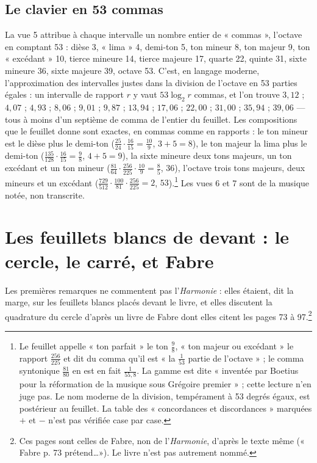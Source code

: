 \documentclass[11pt,a4paper]{article}
\begin{document}
\subsection*{Le clavier en 53 commas}

La vue 5 attribue à chaque intervalle un nombre entier de « commas », l'octave
en comptant 53 : dièse 3, « lima » 4, demi-ton 5, ton mineur 8, ton majeur 9,
ton « excédant » 10, tierce mineure 14, tierce majeure 17, quarte 22, quinte
31, sixte mineure 36, sixte majeure 39, octave 53. C'est, en langage moderne,
l'approximation des intervalles justes dans la division de l'octave en 53
parties égales : un intervalle de rapport $r$ y vaut $53\log_2 r$ commas, et
l'on trouve $3{,}12$ ; $4{,}07$ ; $4{,}93$ ; $8{,}06$ ; $9{,}01$ ; $9{,}87$ ;
$13{,}94$ ; $17{,}06$ ; $22{,}00$ ; $31{,}00$ ; $35{,}94$ ; $39{,}06$ — tous à
moins d'un septième de comma de l'entier du feuillet. Les compositions que le
feuillet donne sont exactes, en commas comme en rapports : le ton mineur est le
dièse plus le demi-ton ($\frac{25}{24}\cdot\frac{16}{15} = \frac{10}{9}$,
$3 + 5 = 8$), le ton majeur la lima plus le demi-ton ($\frac{135}{128}\cdot
\frac{16}{15} = \frac98$, $4 + 5 = 9$), la sixte mineure deux tons majeurs, un
ton excédant et un ton mineur ($\frac{81}{64}\cdot\frac{256}{225}\cdot
\frac{10}{9} = \frac85$, $36$), l'octave trois tons majeurs, deux mineurs et un
excédant ($\frac{729}{512}\cdot\frac{100}{81}\cdot\frac{256}{225} = 2$,
$53$).\footnote{Le feuillet appelle « ton parfait » le ton $\frac98$, « ton
majeur ou excédant » le rapport $\frac{256}{225}$ et dit du comma qu'il est
« la $\frac{1}{53}$ partie de l'octave » ; le comma syntonique $\frac{81}{80}$
en est en fait $\frac{1}{55{,}8}$. La gamme est dite « inventée par Boetius
pour la réformation de la musique sous Grégoire premier » ; cette lecture
n'en juge pas. Le nom moderne de la division, tempérament à 53 degrés égaux,
est postérieur au feuillet. La table des « concordances et discordances »
marquées $+$ et $-$ n'est pas vérifiée case par case.} Les vues 6 et 7 sont de
la musique notée, non transcrite.

\section*{Les feuillets blancs de devant : le cercle, le carré, et Fabre}

Les premières remarques ne commentent pas l'\emph{Harmonie} : elles étaient,
dit la marge, sur les feuillets blancs placés devant le livre, et elles
discutent la quadrature du cercle d'après un livre de Fabre dont elles citent
les pages 73 à 97.\footnote{Ces pages sont celles de Fabre, non de
l'\emph{Harmonie}, d'après le texte même (« Fabre p. 73 prétend\dots »). Le livre
n'est pas autrement nommé.}
\end{document}
